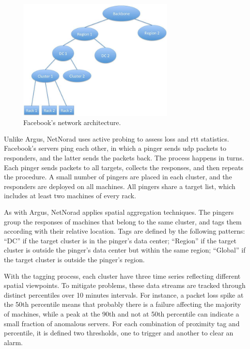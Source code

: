 \begin{figure}[H]
    \centering
    \includegraphics[width=0.7\textwidth]{./figures/literature_review/netnorad_network_architecture.jpg}
    \caption{Facebook's network architecture.~\cite{netnorad}}
\label{fig:netnorad_network_architecture}
\end{figure}%

Unlike Argus, NetNorad uses active probing to assess loss and \gls*{rtt}
statistics.  Facebook's servers ping each other, in which
a pinger sends \gls*{udp} packets to responders, and the latter
sends the packets back. The process happens in turns. Each pinger
sends packets to all targets, collects the responses, and then repeats
the procedure. A small number of pingers are placed in each cluster,
and the responders are
deployed on all machines. All pingers share a target list, which includes
at least two machines of every rack.

As with Argus, NetNorad applies spatial aggregation techniques.
The pingers group the responses of machines that belong to the same cluster,
and tags them according with their relative location.
Tags are defined by the following patterns:
``DC'' if the target cluster is in the pinger's data center;
``Region'' if the target cluster is outside the pinger's
data center but within the same region;
``Global'' if the target cluster is outside the pinger's
region.

With the tagging process, each cluster have three time series reflecting
different spatial viewpoints.
To mitigate problems, these data streams are tracked through
distinct percentiles over 10 minutes intervals.
For instance, a packet loss spike at the
50th percentile means that probably there is a failure affecting the majority of
machines, while a peak at the 90th and not at 50th
percentile can indicate a small fraction of anomalous servers.
For each combination of proximity tag and percentile, it is defined two
thresholds, one to trigger and another to clear an alarm.

